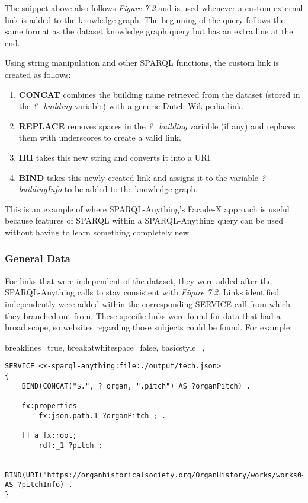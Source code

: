 The snippet above also follows \textit{Figure 7.2} and is used whenever a custom external link is added to the knowledge graph. The beginning of the query follows the same format as the dataset knowledge graph query but has an extra line at the end.

Using string manipulation and other SPARQL functions, the custom link is created as follows:
\begin{enumerate}
    \item \textbf{CONCAT} combines the building name retrieved from the dataset (stored in the \textit{?\_building} variable) with a generic Dutch Wikipedia link.
    \item \textbf{REPLACE} removes spaces in the \textit{?\_building} variable (if any) and replaces them with underscores to create a valid link. 
    \item \textbf{IRI} takes this new string and converts it into a URI.
    \item \textbf{BIND} takes this newly created link and assigns it to the variable \textit{?buildingInfo} to be added to the knowledge graph. 
\end{enumerate}

This is an example of where SPARQL-Anything's Facade-X approach is useful because  features of SPARQL within a SPARQL-Anything query can be used without having to learn something completely new. 

\subsubsection{General Data}
\hspace*{0.5cm} For links that were independent of the dataset, they were added after the SPARQL-Anything calls to stay consistent with \textit{Figure 7.2}. Links identified independently were added within the corresponding SERVICE call from which they branched out from. These specific links were found for data that had a broad scope, so websites regarding those subjects could be found. For example:

\lstset
{
    breaklines=true,
    breakatwhitespace=false,
    basicstyle=\ttfamily,
}
\begin{lstlisting}
SERVICE <x-sparql-anything:file:./output/tech.json>
{
    BIND(CONCAT("$.", ?_organ, ".pitch") AS ?organPitch) .

    fx:properties
        fx:json.path.1 ?organPitch ; .

    [] a fx:root; 
        rdf:_1 ?pitch ;
    
    BIND(URI("https://organhistoricalsociety.org/OrganHistory/works/works04.htm") AS ?pitchInfo) .
} 
\end{lstlisting}

